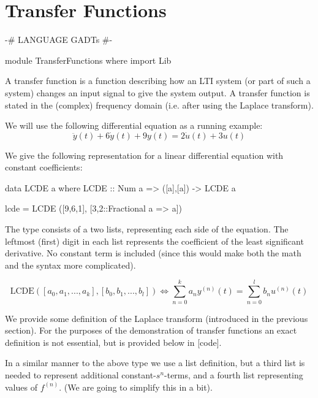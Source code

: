\section{Transfer Functions}
\begin{code}
{-# LANGUAGE GADTs #-}

module TransferFunctions where
  import Lib
\end{code}
\noindent
A transfer function is a function describing how an LTI system (or part of
such a system) changes an input signal to give the system output. A transfer
function is stated in the (complex) frequency domain (i.e. after using the
Laplace transform).

We will use the following differential equation as a running example:
\begin{equation} %
\ddot{y}(t)+6\dot{y}(t)+9y(t)=2\dot{u}(t)+3u(t)
\end{equation}

We give the following representation for a linear differential equation with
constant coefficients:

\begin{code}
data LCDE a where
  LCDE :: Num a => ([a],[a]) -> LCDE a

lcde = LCDE ([9,6,1], [3,2::Fractional a => a])
\end{code} %
The type consists of a two lists, representing each side of the equation. The
leftmost (first) digit in each list represents the coefficient of the least
significant derivative. %
No constant term is included (since this would make both the math and the
syntax more complicated).

\begin{equation}
\text{LCDE}([a_0,a_1,...,a_k],[b_0,b_1,...,b_l]) \iff \sum\limits^{k}_{n=0}{a_n y^{(n)}(t)} = \sum\limits^{l}_{n=0}{b_n u^{(n)}(t)}
\end{equation}

We provide some definition of the Laplace transform (introduced in the
previous section). For the purposes of the demonstration of transfer functions
an exact definition is not essential, but is provided below in [code]. 

In a similar manner to the above type we use a list definition, but a third
list is needed to represent additional constant-$s^n$-terms, and a fourth list
representing values of $f^{(n)}$. (We are going to simplify this in a bit).

